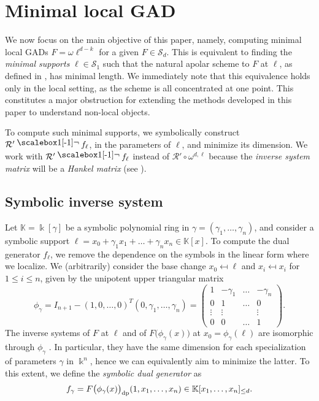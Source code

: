 \documentclass{amsart}
\theoremstyle{plain}
\renewcommand{\k}{\Bbbk}
\newcommand{\K}{\mathbb{K}}
\renewcommand{\S}{\mathcal{S}}
\def\c{\gamma}
\newcommand{\contract}{\mathbin{\mathpalette\dointprod\relax}}
\newcommand{\dointprod}[2]{%
  \raisebox{\depth}{\scalebox{1}[-1]{$#1\lnot$}}}
\def\\k{{\mathsf{k}}}
\def\R{\mathcal{R}}
\numberwithin{equation}{section}
\begin{document}

\section{Minimal local GAD} \label{sec:minLocalGAD}

We now focus on the main objective of this paper, namely, computing minimal local GADs $F = \omega \ell^{d-k}$ for a given $F \in \S_d$.
This is equivalent to finding the \emph{minimal supports} $\ell \in \S_1$ such that the natural apolar scheme to $F$ at $\ell$, as defined in , has minimal length.
We immediately note that this equivalence holds only in the local setting, as the scheme is all concentrated at one point.
This constitutes a major obstruction for extending the methods developed in this paper to understand non-local objects.

To compute such minimal supports, we symbolically construct $\R' \contract f_{\ell}$, in the parameters of $\ell$, and minimize its dimension.
We work with $\R' \contract f_{\ell}$ instead of $\R' \circ \omega^{d,\ell}$ because the \emph{inverse system matrix} %
will be a \emph{Hankel matrix} (see ).

\subsection{Symbolic inverse system} \label{subsec:symbinvsys}

Let $\K = \k[\c]$ be a symbolic polynomial ring in $\c = (\c_1, \dots, \c_n)$, and consider a symbolic support $\ell = x_0 + \c_1 x_1 + \dots + \c_n x_n \in \K[x]$.
To compute the dual generator $f_{\ell}$, we remove the dependence on the symbols in the linear form where we localize.
We (arbitrarily) consider the base change $x_0 \mapsfrom \ell$ and $x_i \mapsfrom x_i$ for $1 \leq i \leq n$, given by the unipotent upper triangular matrix
\[
    \phi_{\c} = I_{n+1} - (1,0,\dots,0)^T(0,\c_1,\dots,\c_n) = \begin{pmatrix}
1 & -\c_1 & \dots & -\c_n\\
0 & 1     & \dots & 0 \\
\vdots & \vdots & & \vdots \\
0 & 0     & \dots & 1 
\end{pmatrix}.
\]
The inverse systems of $F$ at $\ell$ and of $F\big(\phi_{\c}(x) \big)$ at $x_0 = \phi_{\c}(\ell)$ are isomorphic through $\phi_{\c}$ \cite[Cor. 3.8]{BMT25}.
In particular, they have the same dimension for each specialization of parameters $\c$ in $\k^n$, hence we can equivalently aim to minimize the latter.
To this extent, we define the \emph{symbolic dual generator} as
\begin{equation} \label{eq:Fell}
    f_{\c} = F\big(\phi_{\c}(x) \big)_{\rm dp}(1,x_1, \dots,x_n) \in \K[x_1,\dots,x_n]_{\leq d}.
\end{equation}
\end{document}
